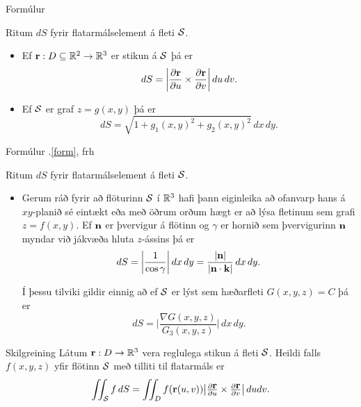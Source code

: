 \begin{frame}{} 

\begin {block}{Formúlur }

 Ritum $dS$ fyrir flatarmálselement á fleti $\cal S$.  
\begin{itemize}
\item Ef $\mbox{${\bf r}$}:D\subseteq{\mathbb R}^2\rightarrow {\mathbb R}^3$ er stikun á $\cal S$ þá
  er $$dS=\bigg|\frac{\partial \mbox{${\bf r}$}}{\partial u}\times\frac{\partial
  \mbox{${\bf r}$}}{\partial v}\bigg|\,du\,dv.$$
\item Ef $\cal S$ er graf $z=g(x,y)$ þá er 
$$dS=\sqrt{1+g_1(x,y)^2+g_2(x,y)^2}\,dx\,dy.$$


\end{itemize}
\end{block}

\end{frame}

\begin{frame}
\begin {block}{Formúlur \kaflanr.\ref{form}, frh}

 Ritum $dS$ fyrir flatarmálselement á fleti $\cal S$.  
\begin{itemize}
\item Gerum ráð fyrir að flöturinn $\cal S$ í ${\mathbb R}^3$ hafi þann eiginleika að
  ofanvarp hans á $xy$-planið sé eintækt eða með öðrum orðum hægt er
  að lýsa fletinum sem grafi $z=f(x,y)$.
Ef $\mbox{${\bf n}$}$ er þvervigur á
flötinn og $\gamma$ er hornið sem þvervigurinn $\mbox{${\bf n}$}$ myndar við
jákvæða hluta $z$-ássins þá er 
$$dS=\bigg|\frac{1}{\cos\gamma}\bigg|\,dx\,dy
=\frac{|\mbox{${\bf n}$}|}{|\mbox{${\bf n}$}\cdot\mbox{${\bf k}$}|}\,dx\,dy.$$

Í þessu tilviki gildir einnig að ef $\cal S$ er lýst sem 
hæðarfleti $G(x,y,z)=C$ þá er 
$$dS=\bigg|\frac{\nabla G(x,y,z)}{G_3(x,y,z)}\bigg|\,dx\,dy.$$
\end{itemize}
\end{block}

\end{frame}





\begin{frame}{} 

\begin {block}{Skilgreining \rtask{}}
 Látum $\mbox{${\bf r}$}: D\rightarrow {\mathbb R}^3$ vera
reglulega stikun á fleti $\cal S$.   
Heildi falls $f(x,y,z)$ yfir flötinn $\cal S$ með tilliti til flatarmáls er
$$\int\!\!\!\int_{\cal S} f\,dS=\int\!\!\!\int_D f(\mbox{${\bf r}$}(u,v)) \big|{\textstyle\frac{\partial
    \mbox{${\bf r}$}}{\partial u} 
\times\frac{\partial \mbox{${\bf r}$}}{\partial v}}\big|\,dudv.$$
\end{block}

\end{frame}

